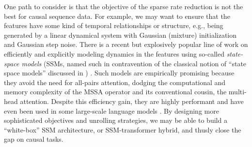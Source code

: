 \documentclass[../../book-main.tex]{subfiles}
\begin{document}
\begin{example}
    One path to consider is that the objective of the sparse rate
    reduction is not the best for causal sequence data. For example,
    we may want to ensure that the features have some kind of
    temporal relationships or structure, e.g., being generated by a
    linear dynamical system with Gaussian (mixture) initialization
    and Gaussian step noise. There is a recent but explosively
    popular line of work on efficiently and explicitly modeling
    dynamics in the features using so-called \textit{state-space
    models} (SSMs, named such in contravention of the classical
    notion of ``state space models'' discussed in )
    \citep{gu2024mamba,yang2024parallelizing,yang2024gated}. Such
    models are empirically promising because they avoid the need for
    all-pairs attention, dodging the computational and memory
    complexity of the MSSA operator and its conventional cousin, the
    multi-head attention. Despite this efficiency gain, they are
    highly performant and have even been used in some large-scale
    language models \citep{team2025kimi}. By designing more
    sophisticated objectives and unrolling strategies, we may be able
    to build a ``white-box'' SSM architecture, or SSM-transformer
    hybrid, and thusly close the gap on causal tasks.
\end{example}
\end{document}
